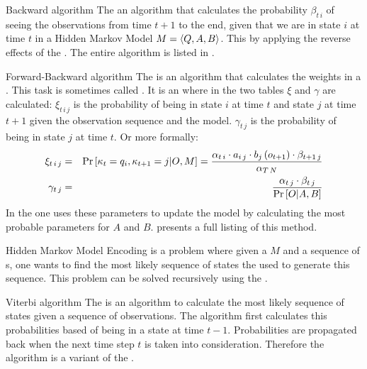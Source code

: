 \begin{df}{Backward algorithm}
The \sb{} an algorithm that calculates the probability $\beta_{t\,i}$ of seeing the observations from time $t+1$ to the end, given that we are in state $i$ at time $t$ in a Hidden Markov Model $M=\left\langle Q,A,B\right\rangle$. This by applying the reverse effects of the . The entire algorithm is listed in .
\end{df}
\begin{df}{Forward-Backward algorithm}
The \sb{} is an algorithm that calculates the weights in a . This task is sometimes called . It is an  where in the  two tables $\xi$ and $\gamma$ are calculated: $\xi_{t\,i\,j}$ is the probability of being in state $i$ at time $t$ and state $j$ at time $t+1$ given the observation sequence and the model. $\gamma_{t\,j}$ is the probability of being in state $j$ at time $t$. Or more formally:
\begin{eqnarray}
\xi_{t\,i\,j}&=&\Pr\left[\kappa_t=q_i,\kappa_{t+1}=j|O,M\right]=\displaystyle\frac{\alpha_{t\,i}\cdot a_{i\,j}\cdot b_{j}\left(o_{t+1}\right)\cdot\beta_{t+1\,j}}{\alpha_{T\,N}}\\
\gamma_{t\,j}&=&\displaystyle\frac{\alpha_{t\,j}\cdot\beta_{t\,j}}{\Pr\left[O|A,B\right]}
\end{eqnarray}
In the  one uses these parameters to update the model by calculating the most probable parameters for $A$ and $B$.  presents a full listing of this method.
\end{df}
\begin{df}{Hidden Markov Model Encoding}
\sb{} is a problem where given a  $M$ and a sequence of s, one wants to find the most likely sequence of states the  used to generate this sequence. This problem can be solved recursively using the .
\end{df}
\begin{df}{Viterbi algorithm}
The \sb{} is an algorithm to calculate the most likely sequence of states given a sequence of observations. The algorithm first calculates this probabilities based of being in a state at time $t-1$. Probabilities are propagated back when the next time step $t$ is taken into consideration. Therefore the algorithm is a variant of the .
\end{df}

